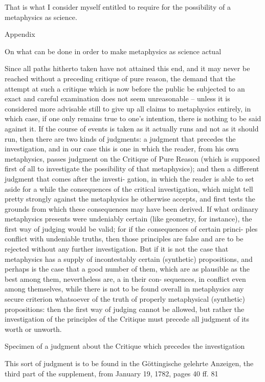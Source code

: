 That is what I consider myself entitled to require for the possibility
of a metaphysics as science.

Appendix

On what can be done in order to
make metaphysics as science actual

Since all paths hitherto taken have not attained this end, and it may never
be reached without a preceding critique of pure reason, the demand that
the attempt at such a critique which is now before the public be subjected
to an exact and careful examination does not seem unreasonable – unless
it is considered more advisable still to give up all claims to metaphysics
entirely, in which case, if one only remains true to one’s intention, there
is nothing to be said against it. If the course of events is taken as it actually
runs and not as it should run, then there are two kinds of judgments: a
judgment that precedes the investigation, and in our case this is one in which
the reader, from his own metaphysics, passes judgment on the Critique of
Pure Reason (which is supposed ﬁrst of all to investigate the possibility of
that metaphysics); and then a different judgment that comes after the investi-
gation, in which the reader is able to set aside for a while the consequences
of the critical investigation, which might tell pretty strongly against the
metaphysics he otherwise accepts, and ﬁrst tests the grounds from which
these consequences may have been derived. If what ordinary metaphysics
presents were undeniably certain (like geometry, for instance), the ﬁrst
way of judging would be valid; for if the consequences of certain princi-
ples conﬂict with undeniable truths, then those principles are false and
are to be rejected without any further investigation. But if it is not the
case that metaphysics has a supply of incontestably certain (synthetic)
propositions, and perhaps is the case that a good number of them, which
are as plausible as the best among them, nevertheless are, a in their con-
sequences, in conﬂict even among themselves, while there is not to be
found overall in metaphysics any secure criterion whatsoever of the truth
of properly metaphysical (synthetic) propositions: then the ﬁrst way of
judging cannot be allowed, but rather the investigation of the principles
of the Critique must precede all judgment of its worth or unworth.

Specimen of a judgment about the Critique
which precedes the investigation

This sort of judgment is to be found in the Göttingische gelehrte Anzeigen,
the third part of the supplement, from January 19, 1782, pages 40 ff. 81

